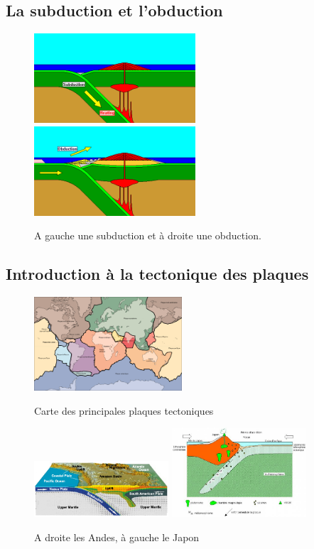 \documentclass{beamer}
\begin{document}
\subsection{La subduction et l'obduction}
\begin{frame}
  \begin{figure}
    \begin{center}
      \includegraphics[width=6cm]{Images/subduction.png}
      \includegraphics[width=6cm]{Images/obduction.png}
      \caption{A gauche une subduction et à droite une obduction.}
    \end{center}
  \end{figure}
\end{frame}

\subsection{Introduction à la tectonique des plaques}
\begin{frame}
  \begin{center}
    \begin{figure}
      \includegraphics[width=5.5cm]{Images/Images_Alexis/plaques.png}
      \caption{Carte des principales plaques tectoniques}
      \includegraphics[width=5cm]{Images/Images_Alexis/andes.jpg}
      \includegraphics[width=5cm]{Images/Images_Alexis/japon.jpg}
      \caption{A droite les Andes, à gauche le Japon}
    \end{figure}
  \end{center}
\end{frame}
\end{document}
